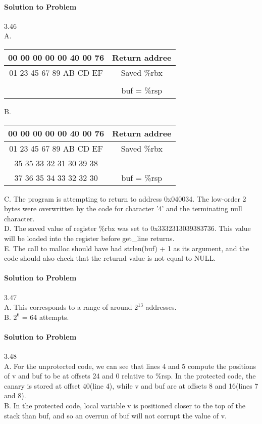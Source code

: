 \documentclass{report}
\begin{document}
\paragraph{Solution to Problem } 3.46\\
A. 
\begin{center}
\begin{tabular}{ |c|c  } 
\hline
00 00 00 00 00 40 00 76 & Return addree \\ \hline
01 23 45 67 89 AB CD EF & Saved \%rbx \\ \hline
 & \\ \hline
 & buf = \%rsp \\ \hline
\end{tabular}
\end{center}
B. 
\begin{center}
\begin{tabular}{ |c|c  } 
\hline
00 00 00 00 00 40 00 76 & Return addree \\ \hline
01 23 45 67 89 AB CD EF & Saved \%rbx \\ \hline
35 35 33 32 31 30 39 38& \\ \hline
37 36 35 34 33 32 32 30 & buf = \%rsp \\ \hline
\end{tabular}
\end{center}
C. The program is attempting to return to address 0x040034. The low-order 2 bytes were overwritten by the code for character '4' and the terminating null character. \\ 
D. The saved value of register \%rbx was set to 0x3332313039383736. This value will be loaded into the register before get\_line returns. \\
E. The call to malloc should have had strlen(buf) + 1 as its argument, and the code should also check that the returnd value is not equal to NULL.

\paragraph{Solution to Problem } 3.47\\
A. This corresponds to a range of around $2^13$ addresses. \\
B. $2^6$ = 64 attempts. \\

\paragraph{Solution to Problem } 3.48\\
A. For the unprotected code, we can see that lines 4 and 5 compute the positions of v and buf to be at offsets 24 and 0 relative to \%rsp. In the protected code, the canary is stored at offset 40(line 4), while v and buf are at offsets 8 and 16(lines 7 and 8).\\
B. In the protected code, local variable v is positioned closer to the top of the stack than buf, and so an overrun of buf will not corrupt the value of v.
\end{document}
